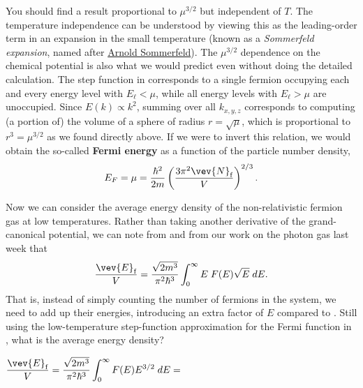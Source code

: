 You should find a result proportional to $\mu^{3 / 2}$ but independent of $T$.
The temperature independence can be understood by viewing this as the leading-order term in an expansion in the small temperature (known as a \textit{Sommerfeld expansion}, named after \href{https://en.wikipedia.org/wiki/Arnold_Sommerfeld}{Arnold Sommerfeld}).
The $\mu^{3 / 2}$ dependence on the chemical potential is also what we would predict even without doing the detailed calculation.
The step function in  corresponds to a single fermion occupying each and every energy level with $E_{\ell} < \mu$, while all energy levels with $E_{\ell} > \mu$ are unoccupied.
Since $E(k) \propto k^2$, summing over all $k_{x, y, z}$ corresponds to computing (a portion of) the volume of a sphere of radius $r = \sqrt{\mu}$, which is proportional to $r^3 = \mu^{3 / 2}$ as we found directly above.
If we were to invert this relation, we would obtain the so-called \textbf{Fermi energy} as a function of the particle number density,
\begin{equation}
  \label{eq:Fermi_energy}
  E_F = \mu = \frac{\hbar^2}{2m}\left(\frac{3\pi^2 \vev{N}_{\text{f}}}{V}\right)^{2 / 3}.
\end{equation}

Now we can consider the average energy density of the non-relativistic fermion gas at low temperatures.
Rather than taking another derivative of the grand-canonical potential, we can note from  and from our work on the photon gas last week that
\begin{equation}
  \frac{\vev{E}_{\text{f}}}{V} = \frac{\sqrt{2m^3}}{\pi^2 \hbar^3} \int_0^{\infty} E \; F(E) \sqrt{E} \; dE.
\end{equation}
That is, instead of simply counting the number of fermions in the system, we need to add up their energies, introducing an extra factor of $E$ compared to .
Still using the low-temperature step-function approximation for the Fermi function in , what is the average energy density?
\begin{mdframed}
  $\displaystyle \frac{\vev{E}_{\text{f}}}{V} = \frac{\sqrt{2m^3}}{\pi^2 \hbar^3} \int_0^{\infty} F(E) E^{3 / 2} \; dE = $ \\[100 pt]
\end{mdframed}

